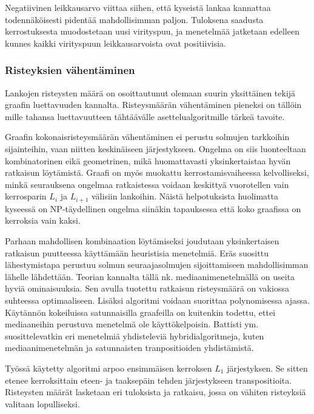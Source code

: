 \documentclass[finnish,12pt]{article}
\begin{document}
Negatiivinen leikkausarvo viittaa siihen, että kyseistä lankaa kannattaa todennäköisesti pidentää mahdollisimman paljon.
Tuloksena saadusta kerrostuksesta muodostetaan uusi virityspuu, ja menetelmää jatketaan edelleen kunnes kaikki virityspuun leikkausarvoista ovat positiivisia.

		\subsubsection{Risteyksien vähentäminen}


Lankojen risteysten määrä on osoittautunut olemaan suurin yksittäinen tekijä graafin luettavuuden kannalta. \cite{RefWorks:47}
Risteysmäärän vähentäminen pieneksi on tällöin mille tahansa luettavuutteen tähtäävälle asettelualgoritmille tärkeä tavoite.

Graafin kokonaisristeysmäärän vähentäminen ei perustu solmujen tarkkoihin sijainteihin, vaan niitten keskinäiseen järjestykseen.
Ongelma on siis luonteeltaan kombinatorinen eikä geometrinen, mikä huomattavasti yksinkertaistaa hyvän ratkaisun löytämistä.
Graafi on myös muokattu kerrostamisvaiheessa kelvolliseksi, minkä seurauksena ongelmaa ratkaistessa voidaan keskittyä vuorotellen vain kerrosparin $L_i$ ja $L_{i+1}$ välisiin lankoihin.
Näistä helpotuksista huolimatta kyseessä on NP-täydellinen ongelma siinäkin tapauksessa että koko graafissa on kerroksia vain kaksi. \cite{RefWorks:40}

Parhaan mahdollisen kombinaation löytämiseksi joudutaan yksinkertaisen ratkaisun puutteessa käyttämään heuristisia menetelmiä.
Eräs suosittu lähestymistapa perustuu solmun seuraajasolmujen sijoittamiseen mahdollisimman lähelle lähdettään.
Teorian kannalta tällä nk. mediaanimenetelmällä on useita hyviä ominaisuuksia.
Sen avulla tuotettu ratkaisun risteysmäärä on vakiossa suhteessa optimaaliseen.
Lisäksi algoritmi voidaan suorittaa polynomisessa ajassa.
Käytännön kokeiluissa satunnaisilla graafeilla on kuitenkin todettu, ettei mediaaneihin perustuva menetelmä ole käyttökelpoisin. \cite{RefWorks:52}
Battisti ym. suosittelevatkin eri menetelmiä yhdisteleviä hybridialgoritmeja, kuten mediaanimenetelmän ja satunnaisten tranpositioiden yhdistämistä\cite{RefWorks:39}.

Työssä käytetty algoritmi arpoo ensimmäisen kerroksen $L_1$ järjestyksen.
Se sitten etenee kerroksittain eteen- ja taaksepäin tehden järjestykseen transpositioita.
Risteysten määrät lasketaan eri tuloksista ja ratkaisu, jossa on vähiten risteyksiä valitaan lopulliseksi.
\end{document}
